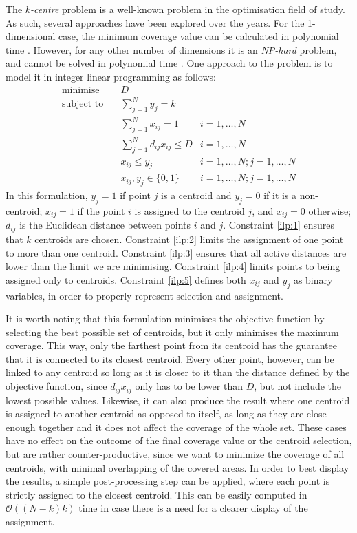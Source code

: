 The \emph{$k$-centre} problem is a well-known problem in the optimisation field of study. As such, several approaches have been explored over the years. For the 1-dimensional case, the minimum coverage value can be calculated in polynomial time \cite{dvaz}. However, for any other number of dimensions it is an \emph{NP-hard} problem, and cannot be solved in polynomial time \cite{complex}. One approach to the problem is to model it in  integer linear programming as follows:
\begin{align}
\text{minimise}   \quad& D				   &\\
\text{subject to} \quad
& \sum\limits_{j=1}^{N}{y_j} = k 
& 							\label{ilp:1}\\
& \sum\limits_{j=1}^{N}{x_{ij}}	= 1   
& i=1,\ldots,N 				\label{ilp:2}\\
& \sum\limits_{j=1}^{N}{d_{ij} x_{ij}} \leq D
& i=1,\ldots,N				\label{ilp:3}\\
& x_{ij} \leq y_{j}				   
& i=1,\ldots,N;j=1,\ldots,N	\label{ilp:4}\\
& x_{ij},y_{j} \in \{0,1\}
& i=1,\ldots,N;j=1,\ldots,N \label{ilp:5}
\end{align}
In this formulation, $y_j = 1$ if point $j$ is a centroid and $y_j = 0$ if it is a non-centroid;
$x_{ij} = 1$ if the point $i$ is assigned to the centroid $j$, and $x_{ij}=0$ otherwise;
$d_{ij}$ is the Euclidean distance between points $i$ and $j$.
Constraint \eqref{ilp:1} ensures that $k$ centroids are chosen.
Constraint \eqref{ilp:2} limits the assignment of one point to more than one centroid.
Constraint \eqref{ilp:3} ensures that all active distances are lower than the limit we are minimising.
Constraint \eqref{ilp:4} limits points to being assigned only to centroids.
Constraint \eqref{ilp:5} defines both $x_{ij}$ and $y_j$ as binary variables, in order to properly represent selection and assignment.

It is worth noting that this formulation minimises the objective function by selecting the best possible set of centroids, but it only minimises the maximum coverage. This way, only the farthest point from its centroid has the guarantee that it is connected to its closest centroid.
Every other point, however, can be linked to any centroid so long as it is closer to it than the distance defined by the objective function, since $d_{ij}x_{ij}$ only has to be lower than $D$, but not include the lowest possible values.
Likewise, it can also produce the result where one centroid is assigned to another centroid as opposed to itself, as long as they are close enough together and it does not affect the coverage of the whole set.
These cases have no effect on the outcome of the final coverage value or the centroid selection, but are rather counter-productive, since we want to minimize the coverage of all centroids, with minimal overlapping of the covered areas.
In order to best display the results, a simple post-processing step can be applied, where each point is strictly assigned to the closest centroid. This can be easily computed in $\mathcal{O}((N-k)k)$ time in case there is a need for a clearer display of the assignment.

